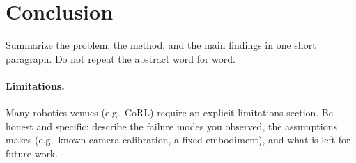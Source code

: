 \section{Conclusion}
\label{sec:conclusion}

Summarize the problem, the method, and the main findings in one short paragraph. Do not repeat the abstract word for word.

\paragraph{Limitations.} Many robotics venues (e.g.\ CoRL) require an explicit limitations section. Be honest and specific: describe the failure modes you observed, the assumptions \method makes (e.g.\ known camera calibration, a fixed embodiment), and what is left for future work.
